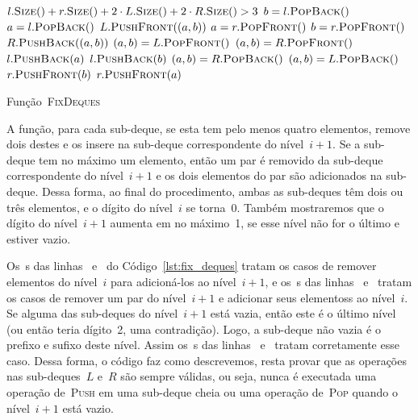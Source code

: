 \documentclass[main.tex]{subfiles}
\begin{document}
\begin{algorithm}
\begin{algorithmic}[1]

\Require $l.\Call{Size}{\null} + r.\Call{Size}{\null} + 2\cdot L.\Call{Size}{\null} + 2\cdot R.\Call{Size}{\null} > 3$
     \label{line:fd:if5}
        \State $b = {l}.\Call{PopBack}{\null}$
        \State $a = {l}.\Call{PopBack}{\null}$
        \State ${L}.\Call{PushFront}{(a, b)}$
    \EndIf
     \label{line:fd:if6}
        \State $a = {r}.\Call{PopFront}{\null}$
        \State $b = {r}.\Call{PopFront}{\null}$
        \State ${R}.\Call{PushBack}{(a, b)}$
    \EndIf
     \label{line:fd:if3}
         \label{line:fd:if1}
            \State $(a, b) = {L}.\Call{PopFront}{\null}$
        \Else
            \State $(a, b) = {R}.\Call{PopFront}{\null}$
        \EndIf
        \State ${l}.\Call{PushBack}{a}$
        \State ${l}.\Call{PushBack}{b}$
    \EndIf
     \label{line:fd:if4}
         \label{line:fd:if2}
            \State $(a, b) = {R}.\Call{PopBack}{\null}$
        \Else
            \State $(a, b) = {L}.\Call{PopBack}{\null}$
        \EndIf
        \State ${r}.\Call{PushFront}{b}$
        \State ${r}.\Call{PushFront}{a}$
    \EndIf
\EndFunction

\end{algorithmic}
\caption{Função~\textsc{FixDeques}} \label{lst:fix_deques}
\end{algorithm}

A função, para cada sub-deque, se esta tem pelo menos quatro elementos, remove dois destes e os insere na sub-deque correspondente do nível~$i+1$. Se a sub-deque tem no máximo um elemento, então um par é removido da sub-deque correspondente do nível~$i+1$ e os dois elementos do par são adicionados na sub-deque. Dessa forma, ao final do procedimento, ambas as sub-deques têm dois ou três elementos, e o dígito do nível~$i$ se torna~0. Também mostraremos que o dígito do nível~$i+1$ aumenta em no máximo~1, se esse nível não for o último e estiver vazio.

Os~s das linhas~ e~ do Código~\ref{lst:fix_deques} tratam os casos de remover elementos do nível~$i$ para adicioná-los ao nível~${i+1}$, e os~s das linhas~ e~ tratam os casos de remover um par do nível~$i+1$ e adicionar seus elementoss ao nível~$i$. Se alguma das sub-deques do nível~$i+1$ está vazia, então este é o último nível (ou então teria dígito~2, uma contradição). Logo, a sub-deque não vazia é o prefixo e sufixo deste nível. Assim os~s das linhas~ e~ tratam corretamente esse caso. Dessa forma, o código faz como descrevemos, resta provar que as operações nas sub-deques~$L$ e~$R$ são sempre válidas, ou seja, nunca é executada uma operação de~\textsc{Push} em uma sub-deque cheia ou uma operação de~\textsc{Pop} quando o nível~$i+1$ está vazio.
\end{document}
